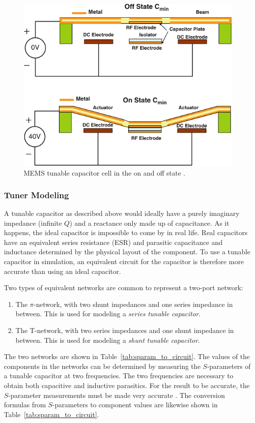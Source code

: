 \begin{figure}[htbp]
    \centering
    \includegraphics{img/analysis/memscap}
    \caption{MEMS tunable capacitor cell in the on and off state \cite{gu2014rf}.}
    \label{fig:memscap}
\end{figure}

\subsubsection{Tuner Modeling}
A tunable capacitor as described above would ideally have a purely imaginary impedance (infinite $Q$) and a reactance only made up of capacitance. As it happens, the ideal capacitor is impossible to come by in real life. Real capacitors have an equivalent series resistance (ESR) and parasitic capacitance and inductance determined by the physical layout of the component. To use a tunable capacitor in simulation, an equivalent circuit for the capacitor is therefore more accurate than using an ideal capacitor.

Two types of equivalent networks are common to represent a two-port network:
\begin{enumerate}
\item The $\pi$-network, with two shunt impedances and one series impedance in between. This is used for modeling a \emph{series tunable capacitor}.
\item The T-network, with two series impedances and one shunt impedance in between. This is used for modeling a \emph{shunt tunable capacitor}.
\end{enumerate}
The two networks are shown in Table~\ref{tab:sparam_to_circuit}. The values of the components in the networks can be determined by measuring the $S$-parameters of a tunable capacitor at two frequencies. The two frequencies are necessary to obtain both capacitive and inductive parasitics. For the result to be accurate, the $S$-parameter measurements must be made very accurate \cite{gu2014rf}. The conversion formulas from $S$-parameters to component values are likewise shown in Table~\ref{tab:sparam_to_circuit}.

